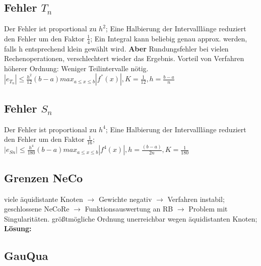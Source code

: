 \subsection{ Fehler $T_{n}$ }
Der Fehler ist proportional zu $ h^2 $; Eine Halbierung der Intervalllänge reduziert den Fehler um den Faktor $ \frac{1}{4} $; Ein Integral kann beliebig genau approx. werden, falls h entsprechend klein gewählt wird. \textbf{Aber} Rundungsfehler bei vielen Rechenoperationen, verschlechtert wieder das Ergebnis. Vorteil von Verfahren höherer Ordnung: Weniger Teilintervalle nötig.
$ |e_{T_n} | \le \frac{ h^2 }{12} (b-a) max_{a \le x \le b} | f^{''} (x) |, K =\frac{1}{12}, h = \frac{ b-a }{n} $

\subsection{Fehler $ S_{n} $}
Der Fehler ist proportional zu $ h^4 $; Eine Halbierung der Intervalllänge reduziert den Fehler um den Faktor $ \frac{1}{16} $;
$ | e_{Sn} | \le \frac{ h^{4} }{180} (b-a) max_{a \le x \le b} | f^{4} (x) |, h= \frac{(b-a)}{2n}, K = \frac{1}{180} $
\subsection{Grenzen NeCo}
viele äquidistante Knoten $\rightarrow$ Gewichte negativ $\rightarrow$ Verfahren instabil; 
geschlossene NeCoRe $\rightarrow$ Funktionsauswertung an RB $\rightarrow$ Problem mit Singularitäten.
größtmögliche Ordnung unerreichbar wegen äquidistanten Knoten; 
\textbf{Lösung:} 

\subsection{GauQua}